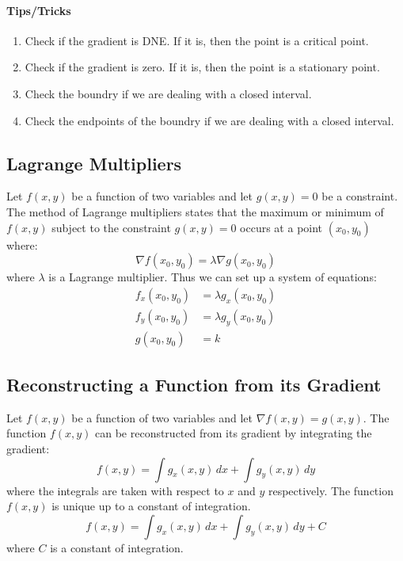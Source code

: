 \documentclass[11pt]{report}
\begin{document}
\paragraph{Tips/Tricks}
\begin{enumerate}
    \item Check if the gradient is DNE. If it is, then the point is a critical point.
    \item Check if the gradient is zero. If it is, then the point is a stationary point.
    \item Check the boundry if we are dealing with a closed interval.
    \item Check the endpoints of the boundry if we are dealing with a closed interval.
\end{enumerate}
\subsection{Lagrange Multipliers}
\begin{theorem}
    Let $f(x, y)$ be a function of two variables and let $g(x, y) = 0$ be a constraint. The method of Lagrange multipliers states that the maximum or minimum of $f(x, y)$ subject to the constraint $g(x, y) = 0$ occurs at a point $(x_0, y_0)$ where:
    \begin{equation}
        \nabla f(x_0, y_0) = \lambda \nabla g(x_0, y_0)
    \end{equation}
    where $\lambda$ is a Lagrange multiplier. Thus we can set up a system of equations:
    \begin{align}
        f_x(x_0, y_0) &= \lambda g_x(x_0, y_0) \\
        f_y(x_0, y_0) &= \lambda g_y(x_0, y_0) \\
        g(x_0, y_0) &= k
    \end{align}

\end{theorem}
\subsection{Reconstructing a Function from its Gradient}
\begin{theorem}
    Let $f(x, y)$ be a function of two variables and let $\nabla f(x, y) = g(x, y)$. The function $f(x, y)$ can be reconstructed from its gradient by integrating the gradient:
    \begin{equation}
        f(x, y) = \int g_x(x, y) \, dx + \int g_y(x, y) \, dy
    \end{equation}
    where the integrals are taken with respect to $x$ and $y$ respectively.
    The function $f(x, y)$ is unique up to a constant of integration.
    \begin{equation}
        f(x, y) = \int g_x(x, y) \, dx + \int g_y(x, y) \, dy + C
    \end{equation}
    where $C$ is a constant of integration.
\end{theorem}
\end{document}
